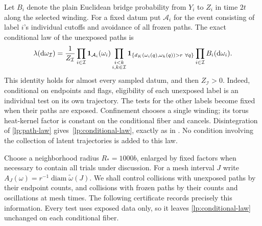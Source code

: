 Let $B_i$ denote the plain Euclidean bridge probability from $Y_i$ to
$Z_i$ in time $2t$ along the selected winding.  For a fixed datum put
$\mathcal A_i$ for the event consisting of label $i$'s individual
cutoffs and avoidance of all frozen paths.  The exact conditional law
of the unexposed paths is
\begin{equation}\label{lp:conditional-law}
 \lambda(\mathrm d\omega_{\mathcal I})
 =\frac1{Z_{\mathcal I}}
    \prod_{i\in\mathcal I}\mathbf 1_{\mathcal A_i}(\omega_i)
    \prod_{\substack{i<k\\i,k\in\mathcal I}}
      \mathbf 1_{\{d_K(\omega_i(q),\omega_k(q))>r\ \forall q\}}
    \prod_{i\in\mathcal I} B_i(\mathrm d\omega_i).
\end{equation}
This identity holds for almost every sampled datum, and then $Z_{\mathcal I}>0$.
Indeed, conditional on endpoints and flags, eligibility of each
unexposed label is an individual test on its own trajectory.  The
tests for the other labels become fixed when their paths are exposed.
Confinement chooses a single winding; its torus heat-kernel factor is
constant on the conditional fiber and cancels.  Disintegration of
\eqref{lp:path-law} gives~\eqref{lp:conditional-law}, exactly as in
\cite[Proposition~6.2]{H}.  No condition involving
the collection of latent trajectories is added to this law.

Choose a neighborhood radius $R_*=1000b$, enlarged by fixed factors
when necessary to contain all trials under discussion.  For a mesh
interval $J$ write
$A_J(\omega)=r^{-1}\operatorname{diam}\widetilde\omega(J)$.
We shall control collisions with unexposed paths by their endpoint
counts, and collisions with frozen paths by their counts and oscillations
at mesh times.  The following certificate records precisely this
information.  Every test uses exposed data only, so it leaves
\eqref{lp:conditional-law} unchanged on each conditional fiber.

